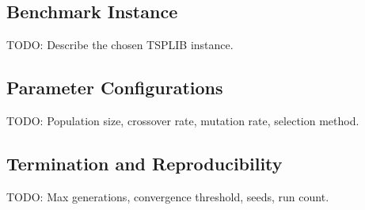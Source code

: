 %

\subsection{Benchmark Instance}
TODO: Describe the chosen TSPLIB instance.

\subsection{Parameter Configurations}
TODO: Population size, crossover rate, mutation rate, selection method.

\subsection{Termination and Reproducibility}
TODO: Max generations, convergence threshold, seeds, run count.
